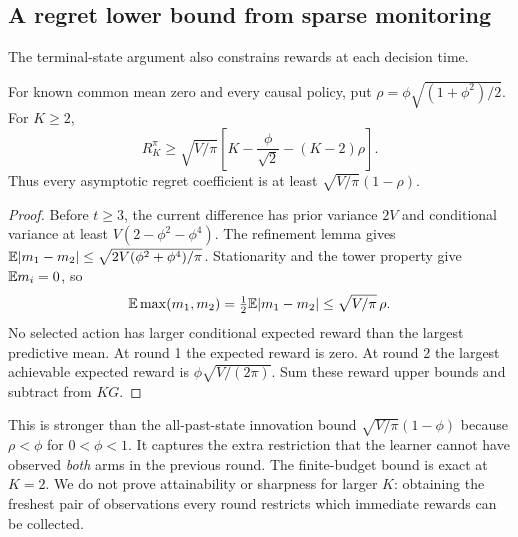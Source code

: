 \subsection{A regret lower bound from sparse monitoring}
The terminal-state argument also constrains rewards at each decision time.

\begin{proposition}
For known common mean zero and every causal policy, put
$\rho=\phi\sqrt{(1+\phi^2)/2}$. For $K\geq2$,
\begin{equation}
\boxed{R_K^\pi\geq\sqrt{V/\pi}
\left[K-\frac\phi{\sqrt2}-(K-2)\rho\right].}
\label{two_arm_ar1:eq:sparse}
\end{equation}
Thus every asymptotic regret coefficient is at least $\sqrt{V/\pi}(1-\rho)$.
\end{proposition}
\begin{proof}
Before $t\geq3$, the current difference has prior variance $2V$ and conditional variance at least $V(2-\phi^2-\phi^4)$. The refinement lemma gives
$\mathbb E|m_1-m_2|\leq\sqrt{2V(\phi^2+\phi^4)/\pi}$.
Stationarity and the tower property give $\mathbb E m_i=0$, so
\[
\mathbb E\max(m_1,m_2)=\tfrac12\mathbb E|m_1-m_2|
\leq\sqrt{V/\pi}\,\rho.
\]
No selected action has larger conditional expected reward than the largest predictive mean. At round 1 the expected reward is zero. At round 2 the largest achievable expected reward is $\phi\sqrt{V/(2\pi)}$. Sum these reward upper bounds and subtract from $KG$.
\end{proof}

This is stronger than the all-past-state innovation bound $\sqrt{V/\pi}(1-\phi)$ because $\rho<\phi$ for $0<\phi<1$. It captures the extra restriction that the learner cannot have observed \emph{both} arms in the previous round. The finite-budget bound is exact at $K=2$. We do not prove attainability or sharpness for larger $K$: obtaining the freshest pair of observations every round restricts which immediate rewards can be collected.

